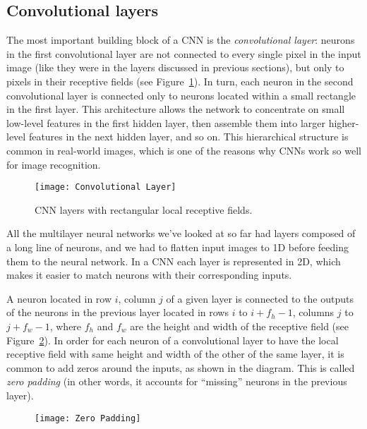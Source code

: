 \subsection{Convolutional layers}
The most important building block of a CNN is the \emph{convolutional layer}: neurons in the first convolutional layer are not connected to every single pixel in the input image (like they were in the layers discussed in previous sections), but only to pixels in their receptive fields (see Figure~\ref{ConvolutionalLayer}). In turn, each neuron in the second convolutional layer is connected only to neurons located within a small rectangle in the first layer. This architecture allows the network to concentrate on small low-level features in the first hidden layer, then assemble them into larger higher-level features in the next hidden layer, and so on. This hierarchical structure is common in real-world images, which is one of the reasons why CNNs work so well for image recognition.
\begin{figure}[h!t]
\centering
\texttt{[image: Convolutional Layer]}
\caption{CNN layers with rectangular local receptive fields.}\label{ConvolutionalLayer}
\end{figure}

All the multilayer neural networks we've looked at so far had layers composed of a long line of neurons, and we had to flatten input images to 1D before feeding them to the neural network. In a CNN each layer is represented in 2D, which makes it easier to match neurons with their corresponding inputs.

A neuron located in row $i$, column $j$ of a given layer is connected to the outputs of the neurons in the previous layer located in rows $i$ to $i+f_h-1$, columns $j$ to $j+f_w-1$, where $f_h$ and $f_w$ are the height and width of the receptive field (see Figure~\ref{ZeroPadding}).
In order for each neuron of a convolutional layer to have the local receptive field with same height and width of the other of the same layer, it is common to add zeros around the inputs, as shown in the diagram.
This is called \emph{zero padding} (in other words, it accounts for ``missing'' neurons in the previous layer).
\begin{figure}[h!t]
\centering
\texttt{[image: Zero Padding]}
\caption{}\label{ZeroPadding}
\end{figure}

